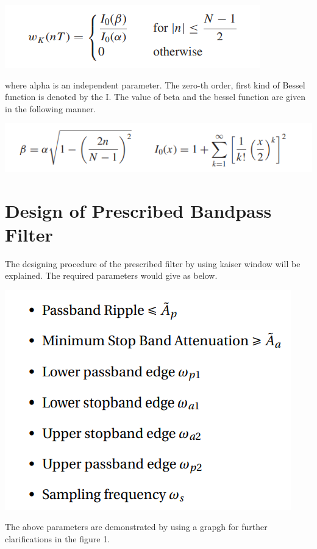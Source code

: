 \documentclass[oneside,11pt,onecolumn,a4paper]{report}
\begin{document}
\includegraphics{Screenshot (169)}

where alpha is an independent parameter. The zero-th order, first kind of  Bessel function is denoted by the I. The value of beta and the bessel function are given in the following manner.

\includegraphics{Screenshot (175)}

\section{Design of Prescribed Bandpass Filter}

\hspace{4em}The designing procedure of the prescribed filter by using kaiser window will be explained. The required parameters would give as below.

\includegraphics{Screenshot (176)}

The above parameters are demonstrated by using a grapgh for further clarifications in the figure 1. 
 
\end{document}

